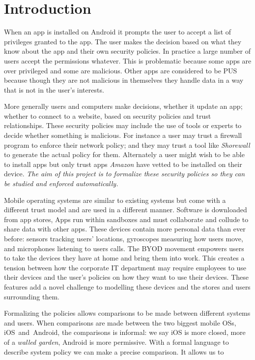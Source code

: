 \documentclass[report.tex]{subfiles}
\begin{document}
\section{Introduction}

When an app is installed on Android it prompts the user to accept a list of
privileges granted to the app.  The user makes the decision based on what they
know about the app and their own security policies.  In practice a large number
of users accept the permissions whatever.  This is problematic because some apps
are over privileged\cite{Felt:2011kj} and some are malicious\cite{Zhou:2012cf}.
Other apps are considered to be \ac{PUS} because though they are not malicious
in themselves they handle data in a way that is not in the user's interests.

More generally users and computers make decisions, whether it update an app;
whether to connect to a website, based on security policies and trust
relationships.  These security policies may include the use of tools or experts
to decide whether something is malicious.  For instance a user may trust a
firewall program to enforce their network policy; and they may trust a tool like
\emph{Shorewall} to generate the actual policy for them.  Alternately a user
might wish to be able to install apps but only trust apps \emph{Amazon} have
vetted to be installed on their device.  \emph{The aim of this project is to
  formalize these security policies so they can be studied and enforced
  automatically.}

Mobile operating systems are similar to existing systems but come with a
different trust model and are used in a different manner.  Software is
downloaded from app stores, Apps run within sandboxes and must collaborate and
collude to share data with other apps. These devices contain more personal data
than ever before: sensors tracking users' locations,  gyroscopes measuring how
users move, and microphones listening to users calls.  The \ac{BYOD} movement
empowers users to take the devices they have at home and bring them into work.
This creates a tension between how the corporate IT department may require
employees to use their devices and the user's policies on how they want to use
their devices.  These features add a novel challenge to modelling these devices
and the stores and users surrounding them.  

Formalizing the policies allows comparisons to be made between different systems
and users.  When comparisons are made between the two biggest mobile OSs,
iOS~and~Android, the comparisons is informal: we say iOS is more closed, more of
a \emph{walled garden}, Android is more permissive.  With a formal language to
describe system policy we can make a precise comparison.  It allows us to 
\end{document}
